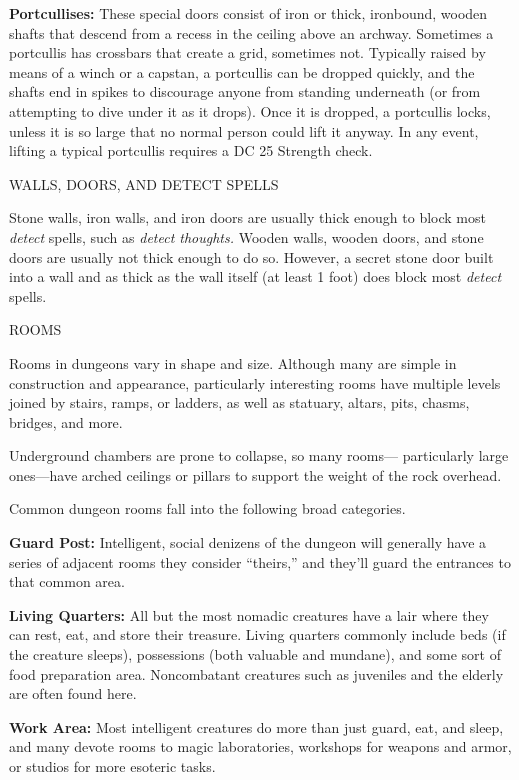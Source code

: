\documentclass{article}
\begin{document}
\textbf{Portcullises: }These special doors consist of iron or thick, ironbound, 
wooden shafts that descend from a recess in the ceiling above an archway. Sometimes 
a portcullis has crossbars that create a grid, sometimes not. Typically raised 
by means of a winch or a capstan, a portcullis can be dropped quickly, and the 
shafts end in spikes to discourage anyone from standing underneath (or from attempting 
to dive under it as it drops). Once it is dropped, a portcullis locks, unless it 
is so large that no normal person could lift it anyway. In any event, lifting a 
typical portcullis requires a DC 25 Strength check.

\vspace{12pt}
WALLS, DOORS, AND DETECT SPELLS

Stone walls, iron walls, and iron doors are usually thick enough to block most 
\textit{detect }spells, such as \textit{detect thoughts. }Wooden walls, wooden 
doors, and stone doors are usually not thick enough to do so. However, a secret 
stone door built into a wall and as thick as the wall itself (at least 1 foot) 
does block most \textit{detect }spells.

\vspace{12pt}
{\large{}ROOMS}

Rooms in dungeons vary in shape and size. Although many are simple in construction 
and appearance, particularly interesting rooms have multiple levels joined by stairs, 
ramps, or ladders, as well as statuary, altars, pits, chasms, bridges, and more.

Underground chambers are prone to collapse, so many rooms--- particularly large 
ones---have arched ceilings or pillars to support the weight of the rock overhead.

Common dungeon rooms fall into the following broad categories. 

\textbf{Guard Post:} Intelligent, social denizens of the dungeon will generally 
have a series of adjacent rooms they consider ``theirs,'' and they'll guard the 
entrances to that common area. 

\textbf{Living Quarters: }All but the most nomadic creatures have a lair where 
they can rest, eat, and store their treasure. Living quarters commonly include 
beds (if the creature sleeps), possessions (both valuable and mundane), and some 
sort of food preparation area. Noncombatant creatures such as juveniles and the 
elderly are often found here.

\textbf{Work Area: }Most intelligent creatures do more than just guard, eat, and 
sleep, and many devote rooms to magic laboratories, workshops for weapons and armor, 
or studios for more esoteric tasks.
\end{document}
